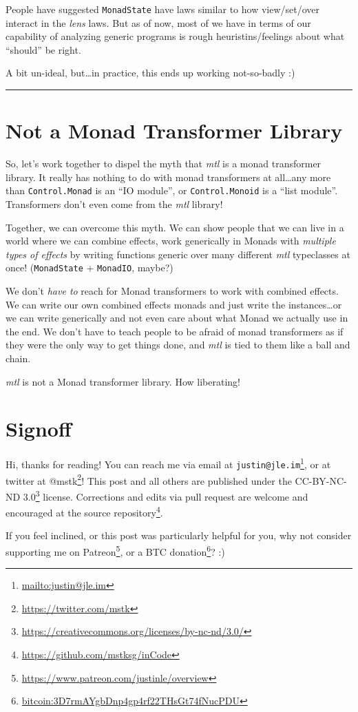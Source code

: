 \documentclass[]{article}
\renewcommand{\href}[2]{#2\footnote{\url{#1}}}
\begin{document}
People have suggested \texttt{MonadState} have laws similar to how view/set/over
interact in the \emph{lens} laws. But as of now, most of we have in terms of our
capability of analyzing generic programs is rough heuristins/feelings about what
``should'' be right.

A bit un-ideal, but\ldots in practice, this ends up working not-so-badly :)

\begin{center}\rule{0.5\linewidth}{0.5pt}\end{center}

\section{Not a Monad Transformer Library}\label{not-a-monad-transformer-library}

So, let's work together to dispel the myth that \emph{mtl} is a monad
transformer library. It really has nothing to do with monad transformers at
all\ldots any more than \texttt{Control.Monad} is an ``IO module'', or
\texttt{Control.Monoid} is a ``list module''. Transformers don't even come from
the \emph{mtl} library!

Together, we can overcome this myth. We can show people that we can live in a
world where we can combine effects, work generically in Monads with
\emph{multiple types of effects} by writing functions generic over many
different \emph{mtl} typeclasses at once! (\texttt{MonadState} +
\texttt{MonadIO}, maybe?)

We don't \emph{have to} reach for Monad transformers to work with combined
effects. We can write our own combined effects monads and just write the
instances\ldots or we can write generically and not even care about what Monad
we actually use in the end. We don't have to teach people to be afraid of monad
transformers as if they were the only way to get things done, and \emph{mtl} is
tied to them like a ball and chain.

\emph{mtl} is not a Monad transformer library. How liberating!

\section{Signoff}\label{signoff}

Hi, thanks for reading! You can reach me via email at
\href{mailto:justin@jle.im}{\nolinkurl{justin@jle.im}}, or at twitter at
\href{https://twitter.com/mstk}{@mstk}! This post and all others are published
under the \href{https://creativecommons.org/licenses/by-nc-nd/3.0/}{CC-BY-NC-ND
3.0} license. Corrections and edits via pull request are welcome and encouraged
at \href{https://github.com/mstksg/inCode}{the source repository}.

If you feel inclined, or this post was particularly helpful for you, why not
consider \href{https://www.patreon.com/justinle/overview}{supporting me on
Patreon}, or a \href{bitcoin:3D7rmAYgbDnp4gp4rf22THsGt74fNucPDU}{BTC donation}?
:)
\end{document}
